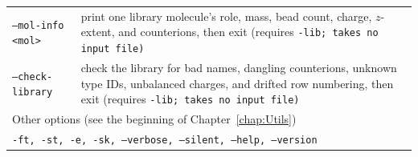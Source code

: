 \begin{longtable}{p{}p{}}
  \tt{--mol-info <mol>}  & print one library molecule's role, mass, bead count,
    charge, $z$-extent, and counterions, then exit (requires \tt{-lib}; takes no
    input file)\\
  \tt{--check-library}   & check the library for bad names, dangling
    counterions, unknown type IDs, unbalanced charges, and drifted row
    numbering, then exit (requires \tt{-lib}; takes no input file)\\
  \midrule
  \multicolumn{2}{l}{Other options (see the beginning of
                     Chapter~\ref{chap:Utils})}\\
  \midrule
  \multicolumn{2}{p{0.948\textwidth}}{\tt{-ft},
                                      \tt{-st},
                                      \tt{-e},
                                      \tt{-sk},
                                      \tt{--verbose},
                                      \tt{--silent},
                                      \tt{--help},
                                      \tt{--version}}\\
  \bottomrule
\end{longtable}

